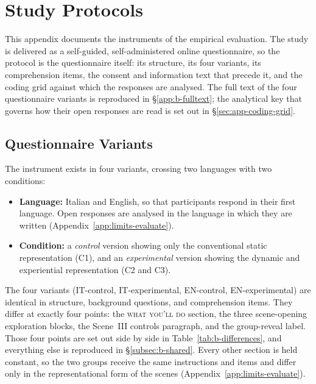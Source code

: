 
\chapter{Study Protocols}
\label{app:protocols}

This appendix documents the instruments of the empirical evaluation. The study is delivered as a self-guided, self-administered online questionnaire, so the protocol is the questionnaire itself: its structure, its four variants, its comprehension items, the consent and information text that precede it, and the coding grid against which the responses are analysed. The full text of the four questionnaire variants is reproduced in \S\ref{app:b-fulltext}; the analytical key that governs how their open responses are read is set out in \S\ref{sec:app-coding-grid}.

\section{Questionnaire Variants}
\label{app:b-variants}

The instrument exists in four variants, crossing two languages with two conditions:

\begin{itemize}
    \item \textbf{Language:} Italian and English, so that participants respond in their first language. Open responses are analysed in the language in which they are written (Appendix~\ref{app:limits-evaluate}).
    \item \textbf{Condition:} a \emph{control} version showing only the conventional static representation (C1), and an \emph{experimental} version showing the dynamic and experiential representation (C2 and C3).
\end{itemize}

\noindent The four variants (IT-control, IT-experimental, EN-control, EN-experimental) are identical in structure, background questions, and comprehension items. They differ at exactly four points: the \textsc{what you'll do} section, the three scene-opening exploration blocks, the Scene~III controls paragraph, and the group-reveal label. Those four points are set out side by side in Table~\ref{tab:b-differences}, and everything else is reproduced in \S\ref{subsec:b-shared}. Every other section is held constant, so the two groups receive the same instructions and items and differ only in the representational form of the scenes (Appendix~\ref{app:limits-evaluate}).

